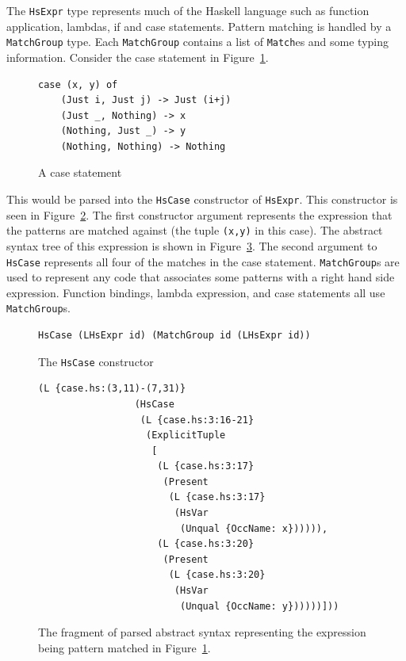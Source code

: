 The \texttt{HsExpr} type represents much of the Haskell language such as function application, lambdas, if and case statements. Pattern matching is handled by a \texttt{MatchGroup} type. Each \texttt{MatchGroup} contains a list of \texttt{Match}es and some typing information. Consider the case statement in Figure~\ref{caseStmt}.

\begin{figure}[t]
\begin{lstlisting}
case (x, y) of
	(Just i, Just j) -> Just (i+j)	
	(Just _, Nothing) -> x
	(Nothing, Just _) -> y
	(Nothing, Nothing) -> Nothing
\end{lstlisting}
\caption{A case statement}
\label{caseStmt}
\end{figure}

This would be parsed into the \texttt{HsCase} constructor of \texttt{HsExpr}. This constructor is seen in Figure~\ref{hscase}. The first constructor argument represents the expression that the patterns are matched against (the tuple \texttt{(x,y)} in this case). The abstract syntax tree of this expression is shown in Figure~\ref{caseAST}. The second argument to \texttt{HsCase} represents all four of the matches in the case statement. \texttt{MatchGroup}s are used to represent any code that associates some patterns with a right hand side expression. Function bindings, lambda expression, and case statements all use \texttt{MatchGroup}s. 

\begin{figure}[t]
\begin{lstlisting}
HsCase (LHsExpr id) (MatchGroup id (LHsExpr id))	
\end{lstlisting}
\caption{The \texttt{HsCase} constructor}
\label{hscase}
\end{figure}

\begin{figure}[t]
\begin{lstlisting}
(L {case.hs:(3,11)-(7,31)} 
                 (HsCase 
                  (L {case.hs:3:16-21} 
                   (ExplicitTuple 
                    [
                     (L {case.hs:3:17} 
                      (Present 
                       (L {case.hs:3:17} 
                        (HsVar 
                         (Unqual {OccName: x}))))),
                     (L {case.hs:3:20} 
                      (Present 
                       (L {case.hs:3:20} 
                        (HsVar 
                         (Unqual {OccName: y})))))]))
\end{lstlisting}
\caption{The fragment of parsed abstract syntax representing the expression being pattern matched in Figure~\ref{caseStmt}.}
\label{caseAST}
\end{figure}

